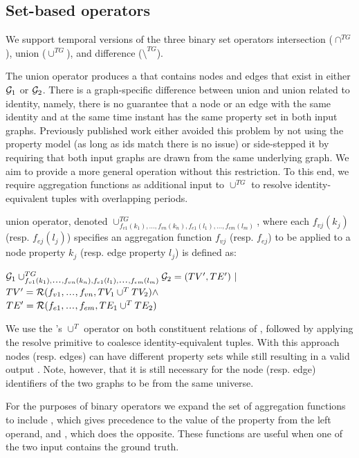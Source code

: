 \subsection{Set-based operators}  

We support temporal versions of the three binary set operators
intersection ($\cap^{TG}$), union ($\cup^{TG}$), and difference
($\setminus^{TG}$).

The union operator produces a \tg that contains nodes and edges that
exist in either $\mathcal{G}_1$ or $\mathcal{G}_2$.  There is a graph-specific
difference between \tra union and \tga union related to identity,
namely, there is no guarantee that a node or an edge with the same
identity and at the same time instant has the same property set in
both input graphs.  Previously published work either avoided this
problem by not using the property model (as long as ids match there is
no issue) or side-stepped it by requiring that both input graphs are
drawn from the same underlying graph.  We aim to provide a more
general operation without this restriction.  To this end, we require
aggregation functions as additional input to $\cup^{TG}$ to resolve
identity-equivalent tuples with overlapping periods.

\begin{definition}[Union]
\label{def:uniontg}
\tg union operator, denoted $\cup^{TG}_{f_{v1}(k_1),\ldots,f_{vn}(k_n),f_{e1}(l_1),\ldots,f_{em}(l_m)}$,
where each $f_{vj}(k_j)$ (resp. $f_{ej}(l_j)$) specifies an aggregation
function $f_{vj}$ (resp. $f_{ej}$) to be applied to a node property
$k_j$ (resp. edge property $l_j$) is defined as:

$\ttt_1 \cup^{TG}_{f_{v1}(k_1)\varlist f_{vn}(k_n),f_{e1}(l_1)\varlist
  f_{em}(l_m)} \ttt_2 = (TV', TE') ~|~$\\$TV' =
\resolve{f_{v1}\varlist f_{vn}}{TV_1 \cup^T TV_2} \land$\\$TE' =
\resolve{f_{e1}\varlist f_{em}}{TE_1 \cup^T TE_2}$
\end{definition}

We use the \tra's $\cup^T$ operator on both constituent relations of
\ttt, followed by applying the resolve primitive to coalesce
identity-equivalent tuples.  With this approach nodes (resp. edges)
can have different property sets while still resulting in a valid
output \tg.  Note, however, that it is still necessary for the node
(resp. edge) identifiers of the two graphs to be from the same
universe.

For the purposes of binary operators we expand the set of aggregation
functions to include , which gives precedence to the value
of the property from the left operand, and , which does
the opposite.  These functions are useful when one of the two input
\tgs contains the ground truth.

